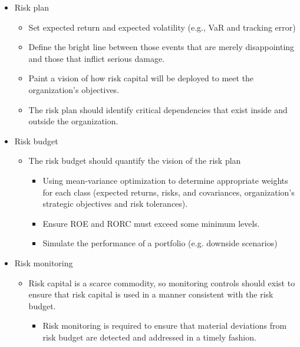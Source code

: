 \begin{itemize}
\item Risk plan
    \begin{itemize}
    \item Set expected return and expected volatility (e.g., VaR and tracking error)
    \item Define the bright line between those events that are merely disappointing and those that inflict serious damage.
    \item Paint a vision of how risk capital will be deployed to meet the organization's objectives.
    \item The risk plan should identify critical dependencies that exist inside and outside the organization.
    \end{itemize}
\item Risk budget
    \begin{itemize}
    \item The risk budget should quantify the vision of the risk plan
        \begin{itemize}
        \item Using mean-variance optimization to determine appropriate weights for each class (expected returns, risks, and covariances, organization's strategic objectives and risk tolerances).
        \item Ensure ROE and RORC must exceed some minimum levels.
        \item Simulate the performance of a portfolio (e.g. downside scenarios)
        \end{itemize}
    \end{itemize}
\item Risk monitoring
    \begin{itemize}
    \item Risk capital is a scarce commodity, so monitoring controls should exist to ensure that risk capital is used in a manner consistent with the risk budget.
        \begin{itemize}
        \item Risk monitoring is required to ensure that material deviations from risk budget are detected and addressed in a timely fashion.
        \end{itemize}
    \end{itemize}
\end{itemize}




